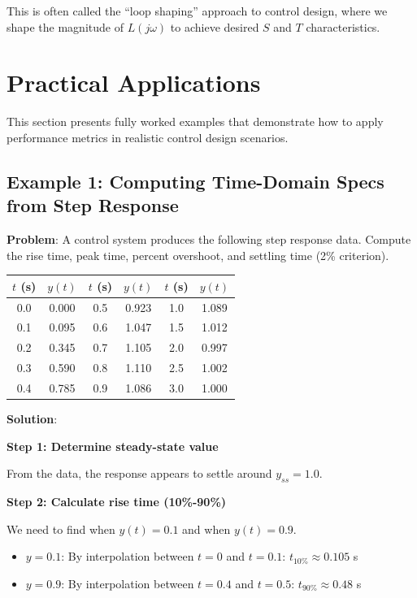 This is often called the ``loop shaping'' approach to control design, where we shape the magnitude of $L(j\omega)$ to achieve desired $S$ and $T$ characteristics.


\section{Practical Applications}
\label{sec:practical_applications}

This section presents fully worked examples that demonstrate how to apply performance metrics in realistic control design scenarios.

\subsection{Example 1: Computing Time-Domain Specs from Step Response}

\textbf{Problem}: A control system produces the following step response data. Compute the rise time, peak time, percent overshoot, and settling time (2\% criterion).

\begin{center}
\begin{tabular}{cc|cc|cc}
\toprule
$t$ (s) & $y(t)$ & $t$ (s) & $y(t)$ & $t$ (s) & $y(t)$ \\
\midrule
0.0 & 0.000 & 0.5 & 0.923 & 1.0 & 1.089 \\
0.1 & 0.095 & 0.6 & 1.047 & 1.5 & 1.012 \\
0.2 & 0.345 & 0.7 & 1.105 & 2.0 & 0.997 \\
0.3 & 0.590 & 0.8 & 1.110 & 2.5 & 1.002 \\
0.4 & 0.785 & 0.9 & 1.086 & 3.0 & 1.000 \\
\bottomrule
\end{tabular}
\end{center}

\textbf{Solution}:

\textbf{Step 1: Determine steady-state value}

From the data, the response appears to settle around $y_{ss} = 1.0$.

\textbf{Step 2: Calculate rise time (10\%-90\%)}

We need to find when $y(t) = 0.1$ and when $y(t) = 0.9$.
\begin{itemize}
    \item $y = 0.1$: By interpolation between $t = 0$ and $t = 0.1$: $t_{10\%} \approx 0.105$ s
    \item $y = 0.9$: By interpolation between $t = 0.4$ and $t = 0.5$: $t_{90\%} \approx 0.48$ s
\end{itemize}

